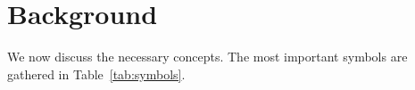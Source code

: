 \documentclass[sigplan,review,anonymous,10pt]{acmart}\settopmatter{printfolios=true,printccs=false,printacmref=false}
\newcommand\mac[1]{\textcolor{red}{[Mac: #1]}}
\begin{document}
%
%

%


%

\vspace{-1em}
\section{Background}

We now discuss the necessary concepts. The most important symbols are gathered in 
Table~\ref{tab:symbols}.
\end{document}
